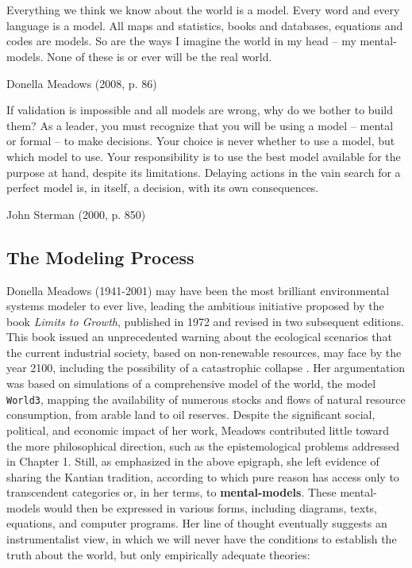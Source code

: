 \documentclass[./main_en.tex]{subfiles}
\begin{document}
\chapter{\chapSysEn} \label{chap:systems}

\setlength{\parskip}{0mm}

\epigraph{\small{Everything we think we know about the world is a \gls{model}. Every word and every language is a \gls{model}. All maps and statistics, books and databases, equations and codes are models. So are the ways I imagine the world in my head -- my \gls{mental-models}. None of these is or ever will be the real world.}}{Donella Meadows (2008, p. 86) \cite{meadows2008}}

\epigraph{\small{If validation is impossible and all models are wrong, why do we bother to build them? As a leader, you must recognize that you will be using a \gls{model} -- mental or formal -- to make decisions. Your choice is never whether to use a \gls{model}, but which \gls{model} to use. Your responsibility is to use the best \gls{model} available for the purpose at hand, despite its limitations. Delaying actions in the vain search for a perfect \gls{model} is, in itself, a decision, with its own consequences.}}{John Sterman (2000, p. 850) \cite{sterman2000}}


\setlength{\parskip}{\myparskip}

\section{The Modeling Process} \label{sec:sys:process}

\par Donella Meadows (1941-2001) may have been the most brilliant environmental systems modeler to ever live, leading the ambitious initiative proposed by the book \textit{Limits to Growth}, published in 1972 and revised in two subsequent editions. This book issued an unprecedented warning about the ecological scenarios that the current industrial society, based on non-renewable resources, may face by the year 2100, including the possibility of a catastrophic collapse \cite{meadows1974}. Her argumentation was based on simulations of a comprehensive \gls{model} of the world, the \gls{model} \texttt{World3}, mapping the availability of numerous stocks and flows of natural resource consumption, from arable land to oil reserves. Despite the significant social, political, and economic impact of her work, Meadows contributed little toward the more philosophical direction, such as the epistemological problems addressed in Chapter 1. Still, as emphasized in the above epigraph, she left evidence of sharing the Kantian tradition, according to which pure reason has access only to transcendent categories or, in her terms, to \textbf{\gls{mental-models}}. These \gls{mental-models} would then be expressed in various forms, including diagrams, texts, equations, and computer programs. Her line of thought eventually suggests an instrumentalist view, in which we will never have the conditions to establish the truth about the world, but only empirically adequate theories:
\end{document}

